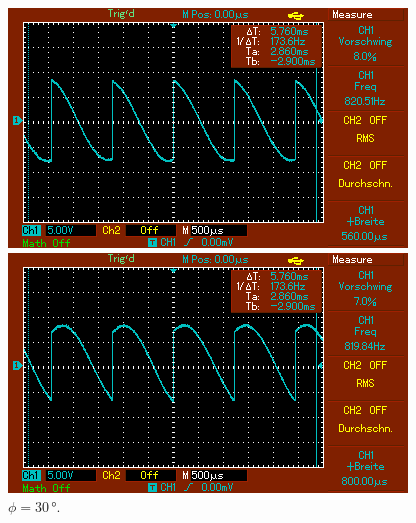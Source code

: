 \begin{figure}
    \begin{minipage}[b]{.45\linewidth} %
       \includegraphics[width=\linewidth]{bilder/MAP003.png}
       \caption{$\phi = 0\,\unit{°}$.}
    \end{minipage}
    \hspace{0.1\linewidth}%
    \begin{minipage}[b]{.45\linewidth} %
       \includegraphics[width=\linewidth]{bilder/MAP004.png}
       \caption{$\phi = 30\,\unit{°}$.}
    \end{minipage}
\end{figure}

